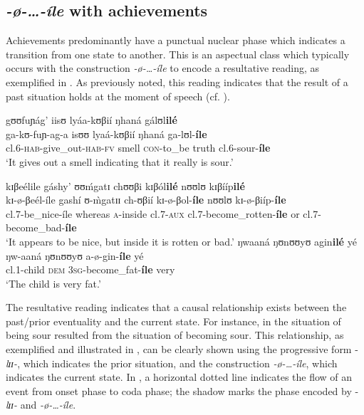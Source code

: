 \documentclass[output=paper,newtxmath,modfonts,nonflat,draftmode]{langsci/langscibook}
\begin{document}
\subsection{\textit{-ø-\ldots-íle} with achievements}

Achievements predominantly have a punctual nuclear phase which indicates a transition from one state to another. This is an aspectual class which typically occurs with the construction \textit{-ø-…-íle} to encode a resultative reading, as exemplified in . As previously noted, this reading indicates that the result of a past situation holds at the moment of speech (cf. \citealt{Comrie1976,Bybee1994}).

\ea \label{ex:kanijo:15}
\ea \glll gʊʊfuɲág’ iisʊ   lyáa-kʊβií ŋhaná {gálʊl\textbf{ilé}}\\
    ga-kʊ-fuɲ-ag-a isʊʊ  lyaá-kʊβií ŋhaná   {ga-lʊl-\textbf{íle}}\\
    cl.6-\textsc{hab}-give\_out-\textsc{hab}-\textsc{fv} smell \textsc{con}-to\_be truth   {cl.6-sour-\textbf{íle}}\\
    \glt ‘It gives out a smell indicating that it really is sour.’

\ex 
    \glll   kɪβeélile       gáshy’      ʊʊḿgatɪ         chʊʊβi      kɪβól\textbf{ilé}  nʊʊlʊ kɪβííp\textbf{ilé}\\ 
            kɪ-ø-βeél-íle    gashí      ʊ-\`{m}gatɪɪ    ch-ʊβií     kɪ-ø-βol-\textbf{íle} nʊʊlʊ kɪ-ø-βiíp-\textbf{íle}\\       
            cl.7-be\_nice-íle  whereas   \textsc{a}-inside        cl.7-\textsc{aux}    cl.7-become\_rotten-\textbf{íle} or     cl.7-become\_bad-\textbf{íle}\\
    \glt ‘It appears to be nice, but inside it is rotten or bad.’
\ex 
    \glll   ŋwaaná   ŋʊnʊʊyʊ    agin\textbf{ilé}  yé\\
            ŋw-aaná   ŋʊnʊʊyʊ   a-ø-gin-\textbf{íle}    yé\\
            cl.1-child \textsc{dem}         3\textsc{sg}-become\_fat-\textbf{íle} very\\
    \glt ‘The child is very fat.’
\z
\z

The resultative reading indicates that a causal relationship exists between the past/prior eventuality and the current state. For instance, in  the situation of being sour resulted from the situation of becoming sour. This relationship, as exemplified and illustrated in , can be clearly shown using the progressive form -\textit{lɪɪ-}, which indicates the prior situation, and the construction \textit{-ø-\ldots-íle}, which indicates the current state. In , a horizontal dotted line indicates the flow of an event from onset phase to coda phase; the shadow marks the phase encoded by -\textit{lɪɪ-} and \textit{-ø-\ldots-íle}. 
\end{document}
